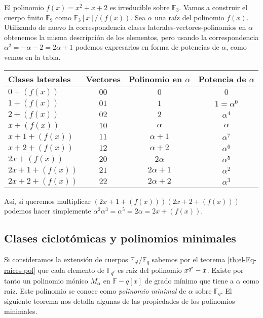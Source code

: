 \begin{example}
  El polinomio \(f(x) = x^2 + x + 2\) es irreducible sobre \(\mathbb F_3\).
  Vamos a construir el cuerpo finito \(\mathbb F_9\) como \(\mathbb F_3[x]/(f(x))\).
  Sea \(\alpha\) una raíz del polinomio \(f(x)\).
  Utilizando de nuevo la correspondencia clases laterales-vectores-polinomios en \(\alpha\) obtenemos la misma descripción de los elementos, pero usando la correspondencia \(\alpha^2 = -\alpha - 2 = 2\alpha + 1\) podemos expresarlos en forma de potencias de \(\alpha\), como vemos en la tabla.
  \begin{table}[h]
    \centering
    \sffamily
    \begin{tabular}{lccc}
      \toprule
      Clases laterales & Vectores & Polinomio en \(\alpha\) & Potencia de \(\alpha\)\\
      \midrule
      \(0 + (f(x))\) & \(00\) & \(0\) & \(0\)\\
      \(1 + (f(x))\) & \(01\) & \(1\) & \(1 = \alpha^0\)\\
      \(2 + (f(x))\) & \(02\) & \(2\) & \(\alpha^4\)\\
      \(x + (f(x))\) & \(10\) & \(\alpha\) & \(\alpha\)\\
      \(x + 1 + (f(x))\) & \(11\) & \(\alpha + 1\) & \(\alpha^7\)\\
      \(x + 2 + (f(x))\) & \(12\) & \(\alpha + 2\) & \(\alpha^6\)\\
      \(2x + (f(x))\) & \(20\) & \(2\alpha\) & \(\alpha^5\)\\
      \(2x + 1 + (f(x))\) & \(21\) & \(2\alpha + 1\) & \(\alpha^2\)\\
      \(2x + 2 + (f(x))\) & \(22\) & \(2\alpha + 2\) & \(\alpha^3\)\\
      \bottomrule
    \end{tabular}
  \end{table}

  Así, si queremos multiplicar \((2x + 1 + (f(x)))(2x + 2 + (f(x)))\) podemos hacer simplemente \(\alpha^2 \alpha^3 = \alpha^5 = 2\alpha = 2x + (f(x))\).
\end{example}


\subsection{Clases ciclotómicas y polinomios minimales}
\label{subsec:clases-ciclotomicas}

Si consideramos la extensión de cuerpos \(\mathbb F_{q^t}/\mathbb F_q\) sabemos por el teorema \ref{th:el-Fq-raices-pol} que cada elemento de \(\mathbb F_{q^t}\) es raíz del polinomio \(\cramped{x^{q^t}} - x\).
Existe por tanto un polinomio mónico \(M_{\alpha}\) en \(\mathbb F-q[x]\) de grado mínimo que tiene a \(\alpha\) como raíz.
Este polinomio se conoce como \emph{polinomio minimal} de \(\alpha\) sobre \(\mathbb F_q\).
El siguiente teorema nos detalla algunas de las propiedades de los polinomios minimales.

